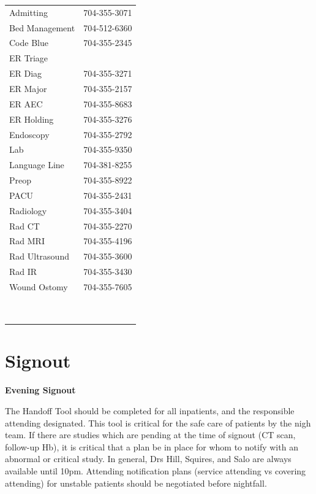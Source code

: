 \documentclass[
  letterpaper,
]{scrbook}
\begin{document}
\begin{longtable}[]{@{}ll@{}}
\toprule\noalign{}
\endhead
\bottomrule\noalign{}
\endlastfoot
Admitting & 704-355-3071 \\
Bed Management & 704-512-6360 \\
Code Blue & 704-355-2345 \\
ER Triage & \\
ER Diag & 704-355-3271 \\
ER Major & 704-355-2157 \\
ER AEC & 704-355-8683 \\
ER Holding & 704-355-3276 \\
Endoscopy & 704-355-2792 \\
Lab & 704-355-9350 \\
Language Line & 704-381-8255 \\
Preop & 704-355-8922 \\
PACU & 704-355-2431 \\
Radiology & 704-355-3404 \\
Rad CT & 704-355-2270 \\
Rad MRI & 704-355-4196 \\
Rad Ultrasound & 704-355-3600 \\
Rad IR & 704-355-3430 \\
Wound Ostomy & 704-355-7605 \\
& \\
& \\
& \\
& \\
& \\
& \\
& \\
& \\
& \\
\end{longtable}

\chapter{Signout}\label{signout}

\textbf{Evening Signout}

The Handoff Tool should be completed for all inpatients, and the
responsible attending designated. This tool is critical for the safe
care of patients by the nigh team. If there are studies which are
pending at the time of signout (CT scan, follow-up Hb), it is critical
that a plan be in place for whom to notify with an abnormal or critical
study. In general, Drs Hill, Squires, and Salo are always available
until 10pm. Attending notification plans (service attending vs covering
attending) for unstable patients should be negotiated before nightfall.
\end{document}
